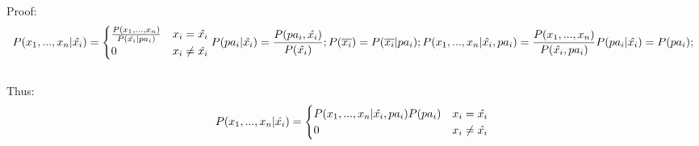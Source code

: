 \documentclass{beamer}
\begin{document}
\begin{frame}

Proof:
$$\\
P(x_1,...,x_n|\hat{x_i}) =\begin{cases} \frac{P(x_1,...,x_n)}{P(\hat{x_i}|pa_i)} &  x_i=\hat{x_i} \\ 0 &  x_i\neq \hat{x_i} \end{cases}

P(pa_i|\hat{x_i}) = \frac{P(pa_i,\hat{x_i})}{P(\hat{x_i})};

P(\overline{x_i}) = P( \overline{x_i}|pa_i);

P(x_1,...,x_n|\hat{x_i},pa_i) = \frac{P(x_1,...,x_n)}{P(\hat{x_i},pa_i)}

P(pa_i|\hat{x_i}) = P(pa_i);
$$\\


Thus:
$$
P(x_1,...,x_n|\hat{x_i}) =\begin{cases} P(x_1,...,x_n|\hat{x_i},pa_i)P(pa_i) &  x_i=\hat{x_i} \\ 0 &  x_i\neq \hat{x_i} \end{cases}\\
$$



\end{frame}
\end{document}
